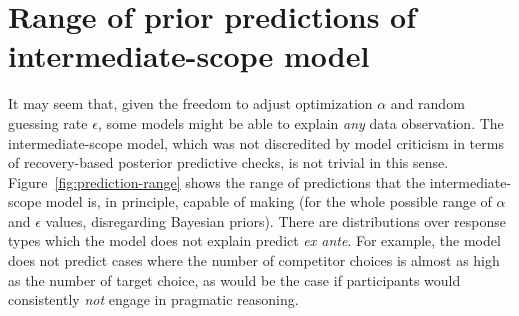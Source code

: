 \documentclass{article}
\begin{document}
\section{Range of prior predictions of intermediate-scope model}
\label{sec:range-prior-pred}

It may seem that, given the freedom to adjust optimization $\alpha$ and random guessing rate $\epsilon$, some models might be able to explain \emph{any} data observation.
The intermediate-scope model, which was not discredited by model criticism in terms of recovery-based posterior predictive checks, is not trivial in this sense.
Figure~\ref{fig:prediction-range} shows the range of predictions that the intermediate-scope model is, in principle, capable of making (for the whole possible range of \(\alpha\) and \(\epsilon\) values, disregarding Bayesian priors).
There are distributions over response types which the model does not explain predict \emph{ex ante}.
For example, the model does not predict cases where the number of competitor choices is almost as high as the number of target choice, as would be the case if participants would consistently \emph{not} engage in pragmatic reasoning.
\end{document}
